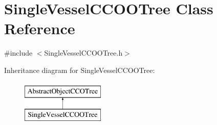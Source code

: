 \hypertarget{class_single_vessel_c_c_o_o_tree}{}\section{Single\+Vessel\+C\+C\+O\+O\+Tree Class Reference}
\label{class_single_vessel_c_c_o_o_tree}


{\ttfamily \#include $<$Single\+Vessel\+C\+C\+O\+O\+Tree.\+h$>$}

Inheritance diagram for Single\+Vessel\+C\+C\+O\+O\+Tree\+:\begin{figure}[H]
\begin{center}
\leavevmode
\includegraphics[height=2.000000cm]{dc/d93/class_single_vessel_c_c_o_o_tree}
\end{center}
\end{figure}
